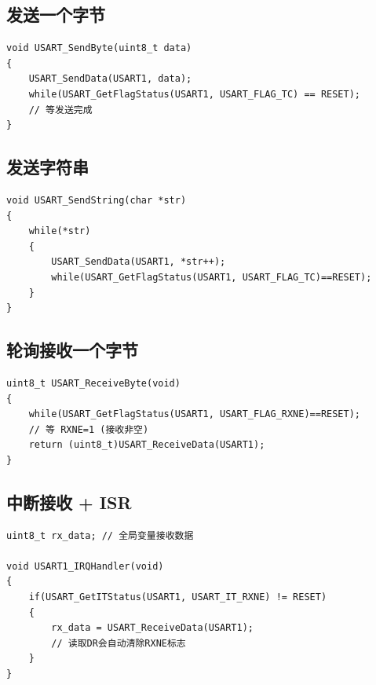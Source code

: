 \documentclass[10pt,a4paper,oneside]{ctexart}
\begin{document}
\subsection*{发送一个字节}

\begin{codebox}
\begin{lstlisting}[style=stm32, numbers=none]
void USART_SendByte(uint8_t data)
{
    USART_SendData(USART1, data);
    while(USART_GetFlagStatus(USART1, USART_FLAG_TC) == RESET);
    // 等发送完成
}
\end{lstlisting}
\end{codebox}

\subsection*{发送字符串}

\begin{codebox}
\begin{lstlisting}[style=stm32, numbers=none]
void USART_SendString(char *str)
{
    while(*str)
    {
        USART_SendData(USART1, *str++);
        while(USART_GetFlagStatus(USART1, USART_FLAG_TC)==RESET);
    }
}
\end{lstlisting}
\end{codebox}

\subsection*{轮询接收一个字节}

\begin{codebox}
\begin{lstlisting}[style=stm32, numbers=none]
uint8_t USART_ReceiveByte(void)
{
    while(USART_GetFlagStatus(USART1, USART_FLAG_RXNE)==RESET);
    // 等 RXNE=1 (接收非空)
    return (uint8_t)USART_ReceiveData(USART1);
}
\end{lstlisting}
\end{codebox}

\subsection*{中断接收 + ISR}

\begin{codebox}
\begin{lstlisting}[style=stm32, numbers=none]
uint8_t rx_data; // 全局变量接收数据

void USART1_IRQHandler(void)
{
    if(USART_GetITStatus(USART1, USART_IT_RXNE) != RESET)
    {
        rx_data = USART_ReceiveData(USART1);
        // 读取DR会自动清除RXNE标志
    }
}
\end{lstlisting}
\end{codebox}
\end{document}
